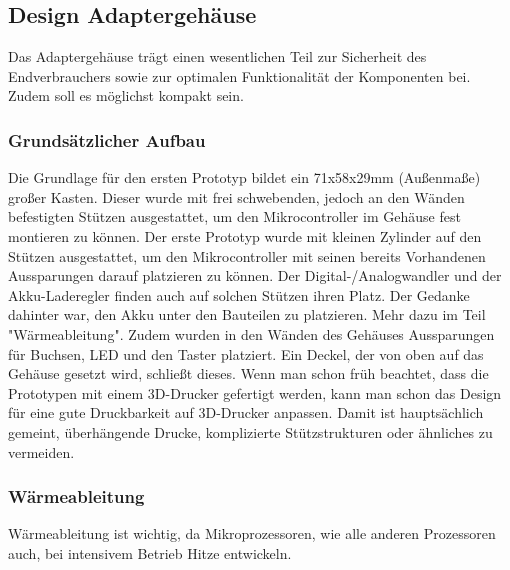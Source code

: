 \documentclass[]{article}
\begin{document}
\subsection{Design Adaptergehäuse}
Das Adaptergehäuse trägt einen wesentlichen Teil zur Sicherheit des Endverbrauchers sowie zur optimalen Funktionalität der Komponenten bei. Zudem soll es möglichst kompakt sein.
\subsubsection{Grundsätzlicher Aufbau}
Die Grundlage für den ersten Prototyp bildet ein 71x58x29mm (Außenmaße) großer Kasten.\newline
Dieser wurde mit frei schwebenden, jedoch an den Wänden befestigten Stützen ausgestattet, um den Mikrocontroller im Gehäuse fest montieren zu können. Der erste Prototyp wurde mit kleinen Zylinder auf den Stützen ausgestattet, um den Mikrocontroller mit seinen bereits Vorhandenen Aussparungen darauf platzieren zu können. Der Digital-/Analogwandler und der Akku-Laderegler finden auch auf solchen Stützen ihren Platz. Der Gedanke dahinter war, den Akku unter den Bauteilen zu platzieren. Mehr dazu im Teil "Wärmeableitung". Zudem wurden in den Wänden des Gehäuses Aussparungen für Buchsen, LED und den Taster platziert. Ein Deckel, der von oben auf das Gehäuse gesetzt wird, schließt dieses. Wenn man schon früh beachtet, dass die Prototypen mit einem 3D-Drucker gefertigt werden, kann man schon das Design für eine gute Druckbarkeit auf 3D-Drucker anpassen. Damit ist hauptsächlich gemeint, überhängende Drucke, komplizierte Stützstrukturen oder ähnliches zu vermeiden.
\subsubsection{Wärmeableitung}
Wärmeableitung ist wichtig, da Mikroprozessoren, wie alle anderen Prozessoren auch, bei intensivem Betrieb Hitze entwickeln.
\end{document}
